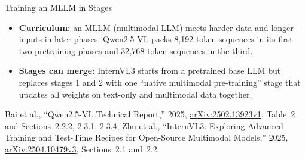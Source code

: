 \begin{frame}{Training an MLLM in Stages}
\begin{itemize}
    \item \textbf{Curriculum:} an MLLM (multimodal LLM) meets harder data and longer inputs in later phases. Qwen2.5-VL packs 8{,}192-token sequences in its first two pretraining phases and 32{,}768-token sequences in the third.
    \item \textbf{Stages can merge:} InternVL3 starts from a pretrained base LLM but replaces stages 1 and 2 with one ``native multimodal pre-training'' stage that updates all weights on text-only and multimodal data together.
  \end{itemize}
  \vspace{0.1em}
  {\scriptsize Bai et al., ``Qwen2.5-VL Technical Report,'' 2025, \href{https://arxiv.org/abs/2502.13923v1}{arXiv:2502.13923v1}, Table~2 and Sections~2.2.2, 2.3.1, 2.3.4; Zhu et al., ``InternVL3: Exploring Advanced Training and Test-Time Recipes for Open-Source Multimodal Models,'' 2025, \href{https://arxiv.org/abs/2504.10479v3}{arXiv:2504.10479v3}, Sections~2.1 and~2.2.\par}
\end{frame}

